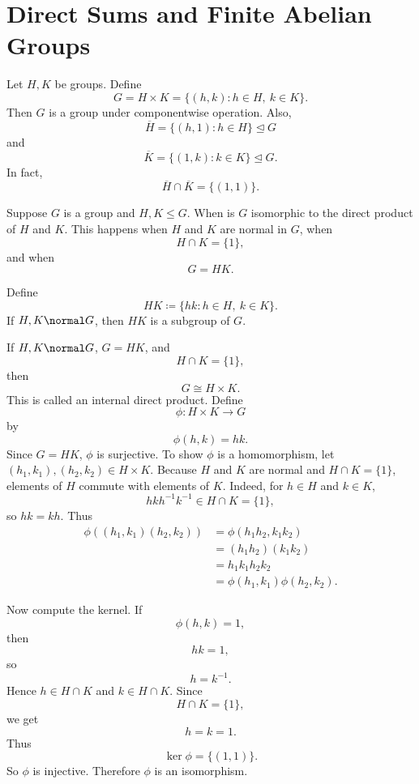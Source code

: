 
\section{Direct Sums and Finite Abelian Groups}

\begin{definition}
Let $H,K$ be groups.
Define
\[
G=H\times K=\{(h,k):h\in H,\ k\in K\}.
\]
Then $G$ is a group under componentwise operation.
Also,
\[
\overline{H}=\{(h,1):h\in H\}\trianglelefteq G
\]
and
\[
\overline{K}=\{(1,k):k\in K\}\trianglelefteq G.
\]
In fact,
\[
\overline{H}\cap \overline{K}=\{(1,1)\}.
\]
\end{definition}

\begin{theorem}{
Suppose $G$ is a group and $H,K\leq G$.
When is $G$ isomorphic to the direct product of $H$ and $K$.
}
This happens when $H$ and $K$ are normal in $G$, when
\[
H\cap K=\{1\},
\]
and when
\[
G=HK.
\]
\end{theorem}

\begin{remark}
Define
\[
HK\coloneqq \{hk:h\in H,\ k\in K\}.
\]
If $H,K\normal G$, then $HK$ is a subgroup of $G$.
\end{remark}

\begin{theorem}{
If $H,K\normal G$, $G=HK$, and
\[
H\cap K=\{1\},
\]
then
\[
G\cong H\times K.
\]
This is called an internal direct product.
}
Define
\[
\phi:H\times K\to G
\]
by
\[
\phi(h,k)=hk.
\]
Since $G=HK$, $\phi$ is surjective.
To show $\phi$ is a homomorphism, let $(h_1,k_1),(h_2,k_2)\in H\times K$.
Because $H$ and $K$ are normal and $H\cap K=\{1\}$, elements of $H$ commute with elements of $K$.
Indeed, for $h\in H$ and $k\in K$,
\[
hkh^{-1}k^{-1}\in H\cap K=\{1\},
\]
so $hk=kh$.
Thus
\begin{align*}
\phi((h_1,k_1)(h_2,k_2))
&=
\phi(h_1h_2,k_1k_2)\\
&=
(h_1h_2)(k_1k_2)\\
&=
h_1k_1h_2k_2\\
&=
\phi(h_1,k_1)\phi(h_2,k_2).
\end{align*}

Now compute the kernel.
If
\[
\phi(h,k)=1,
\]
then
\[
hk=1,
\]
so
\[
h=k^{-1}.
\]
Hence $h\in H\cap K$ and $k\in H\cap K$.
Since
\[
H\cap K=\{1\},
\]
we get
\[
h=k=1.
\]
Thus
\[
\ker\phi=\{(1,1)\}.
\]
So $\phi$ is injective.
Therefore $\phi$ is an isomorphism.
\end{theorem}

